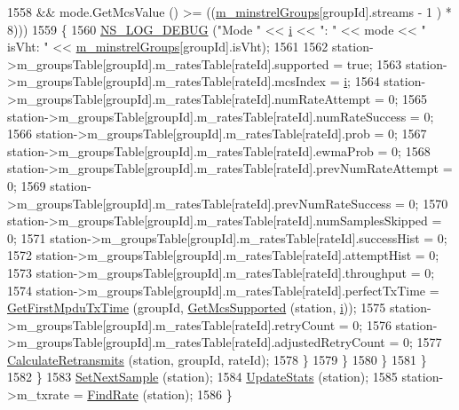 \begin{DoxyCode}
1558                           && mode.GetMcsValue () >= ((\hyperlink{classns3_1_1MinstrelHtWifiManager_a231741ce3f38417925019aa598570468}{m\_minstrelGroups}[groupId].streams - 1
      ) * 8)))
1559                     \{
1560                       \hyperlink{group__logging_ga413f1886406d49f59a6a0a89b77b4d0a}{NS\_LOG\_DEBUG} (\textcolor{stringliteral}{"Mode "} << \hyperlink{bernuolliDistribution_8m_a6f6ccfcf58b31cb6412107d9d5281426}{i} << \textcolor{stringliteral}{": "} << mode << \textcolor{stringliteral}{" isVht: "} << 
      \hyperlink{classns3_1_1MinstrelHtWifiManager_a231741ce3f38417925019aa598570468}{m\_minstrelGroups}[groupId].isVht);
1561 
1562                       station->m\_groupsTable[groupId].m\_ratesTable[rateId].supported = \textcolor{keyword}{true};
1563                       station->m\_groupsTable[groupId].m\_ratesTable[rateId].mcsIndex = 
      \hyperlink{bernuolliDistribution_8m_a6f6ccfcf58b31cb6412107d9d5281426}{i};         
1564                       station->m\_groupsTable[groupId].m\_ratesTable[rateId].numRateAttempt = 0;
1565                       station->m\_groupsTable[groupId].m\_ratesTable[rateId].numRateSuccess = 0;
1566                       station->m\_groupsTable[groupId].m\_ratesTable[rateId].prob = 0;
1567                       station->m\_groupsTable[groupId].m\_ratesTable[rateId].ewmaProb = 0;
1568                       station->m\_groupsTable[groupId].m\_ratesTable[rateId].prevNumRateAttempt = 0;
1569                       station->m\_groupsTable[groupId].m\_ratesTable[rateId].prevNumRateSuccess = 0;
1570                       station->m\_groupsTable[groupId].m\_ratesTable[rateId].numSamplesSkipped = 0;
1571                       station->m\_groupsTable[groupId].m\_ratesTable[rateId].successHist = 0;
1572                       station->m\_groupsTable[groupId].m\_ratesTable[rateId].attemptHist = 0;
1573                       station->m\_groupsTable[groupId].m\_ratesTable[rateId].throughput = 0;
1574                       station->m\_groupsTable[groupId].m\_ratesTable[rateId].perfectTxTime = 
      \hyperlink{classns3_1_1MinstrelHtWifiManager_a53308ad39a550d0972aad572b3566ec5}{GetFirstMpduTxTime} (groupId, \hyperlink{classns3_1_1WifiRemoteStationManager_af21ecff608cea2837c1af9385bbe6e4e}{GetMcsSupported} (station, 
      \hyperlink{bernuolliDistribution_8m_a6f6ccfcf58b31cb6412107d9d5281426}{i}));
1575                       station->m\_groupsTable[groupId].m\_ratesTable[rateId].retryCount = 0;
1576                       station->m\_groupsTable[groupId].m\_ratesTable[rateId].adjustedRetryCount = 0;
1577                       \hyperlink{classns3_1_1MinstrelHtWifiManager_a01ece0b82fd4cefb27de6a8759bc9529}{CalculateRetransmits} (station, groupId, rateId);
1578                     \}
1579                 \}
1580             \}
1581         \}
1582     \}
1583   \hyperlink{classns3_1_1MinstrelHtWifiManager_a2c3213dddeb9e0917073482f732127ed}{SetNextSample} (station);                  
1584   \hyperlink{classns3_1_1MinstrelHtWifiManager_add9ba12485354ddfaae5a68a90469a92}{UpdateStats} (station);                    
1585   station->m\_txrate = \hyperlink{classns3_1_1MinstrelHtWifiManager_a06c5d6ae62e898a226ffd6cb0b448038}{FindRate} (station);   
1586 \}
\end{DoxyCode}


